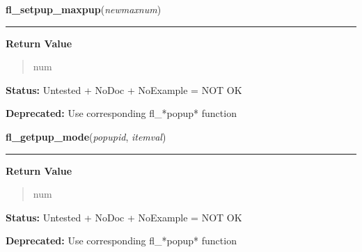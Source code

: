     \label{xformslib:library:fl_setpup_maxpup}

    \vspace{0.5ex}

\hspace{.8\funcindent}\begin{boxedminipage}{\funcwidth}

    \raggedright \textbf{fl\_setpup\_maxpup}(\textit{newmaxnum})

    \vspace{-1.5ex}

    \rule{\textwidth}{0.5\fboxrule}
\setlength{\parskip}{2ex}
\setlength{\parskip}{1ex}
      \textbf{Return Value}
    \vspace{-1ex}

      \begin{quote}
      num

      \end{quote}

\textbf{Status:} Untested + NoDoc + NoExample = NOT OK



\textbf{Deprecated:} Use corresponding fl\_*popup* function



    \end{boxedminipage}

    \label{xformslib:library:fl_getpup_mode}

    \vspace{0.5ex}

\hspace{.8\funcindent}\begin{boxedminipage}{\funcwidth}

    \raggedright \textbf{fl\_getpup\_mode}(\textit{popupid}, \textit{itemval})

    \vspace{-1.5ex}

    \rule{\textwidth}{0.5\fboxrule}
\setlength{\parskip}{2ex}
\setlength{\parskip}{1ex}
      \textbf{Return Value}
    \vspace{-1ex}

      \begin{quote}
      num

      \end{quote}

\textbf{Status:} Untested + NoDoc + NoExample = NOT OK



\textbf{Deprecated:} Use corresponding fl\_*popup* function



    \end{boxedminipage}

